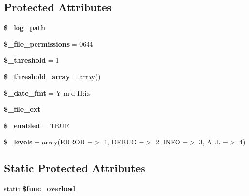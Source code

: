 \subsection*{Protected Attributes}
\begin{DoxyCompactItemize}
\item 
\mbox{\label{class_c_i___log_ad8a8ef9a05316719565ea9efd5d11db0}} 
{\bfseries \$\+\_\+log\+\_\+path}
\item 
\mbox{\label{class_c_i___log_a5aba90f8cd11fefb4a34f98ee2f92e88}} 
{\bfseries \$\+\_\+file\+\_\+permissions} = 0644
\item 
\mbox{\label{class_c_i___log_aa0bfdb11c81b1d496cab288533f5cedf}} 
{\bfseries \$\+\_\+threshold} = 1
\item 
\mbox{\label{class_c_i___log_a3eb60547e6a2017f8366845eea20031c}} 
{\bfseries \$\+\_\+threshold\+\_\+array} = array()
\item 
\mbox{\label{class_c_i___log_a11a2b3fb706079ee22333ebcf4bdc44b}} 
{\bfseries \$\+\_\+date\+\_\+fmt} = \textquotesingle{}Y-\/m-\/d H\+:i\+:s\textquotesingle{}
\item 
\mbox{\label{class_c_i___log_ae8e714753edca4fbfeda22c22b0f5513}} 
{\bfseries \$\+\_\+file\+\_\+ext}
\item 
\mbox{\label{class_c_i___log_a1a6e6b5b0c06f3a75ae024e031c01755}} 
{\bfseries \$\+\_\+enabled} = T\+R\+UE
\item 
\mbox{\label{class_c_i___log_ac94e6284685df120e874041016a4d4a9}} 
{\bfseries \$\+\_\+levels} = array(\textquotesingle{}E\+R\+R\+OR\textquotesingle{} =$>$ 1, \textquotesingle{}D\+E\+B\+UG\textquotesingle{} =$>$ 2, \textquotesingle{}I\+N\+FO\textquotesingle{} =$>$ 3, \textquotesingle{}A\+LL\textquotesingle{} =$>$ 4)
\end{DoxyCompactItemize}
\subsection*{Static Protected Attributes}
\begin{DoxyCompactItemize}
\item 
\mbox{\label{class_c_i___log_a470fb95f4eaca2b913f60a5cb6b414d2}} 
static {\bfseries \$func\+\_\+overload}
\end{DoxyCompactItemize}


